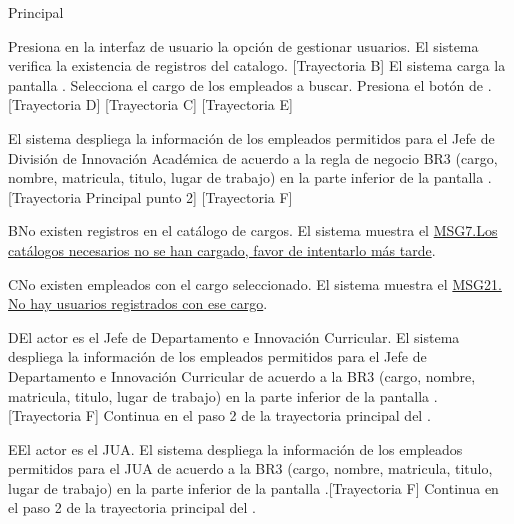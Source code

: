 \begin{UCtrayectoria}{Principal}
    
    \UCpaso[\UCactor] Presiona en la interfaz de usuario  la opción de gestionar usuarios. 
    \UCpaso  El sistema verifica la existencia de registros del catalogo. [Trayectoria B] 
    \UCpaso El sistema carga la pantalla  .
    \UCpaso[\UCactor] Selecciona el cargo de los empleados a buscar. 
    \UCpaso[\UCactor]  Presiona el botón de . [Trayectoria D] [Trayectoria C] [Trayectoria E]
    
    \UCpaso El sistema despliega la información de los empleados permitidos para el Jefe de División de Innovación Académica de acuerdo a la regla de negocio BR3 (cargo, nombre, matricula, titulo, lugar de trabajo) en la parte inferior de la pantalla . [Trayectoria Principal punto 2] [Trayectoria F]
\end{UCtrayectoria}

\begin{UCtrayectoriaA}{B}{No existen registros en el catálogo de cargos.}
    \UCpaso     El sistema muestra el \hyperref[MSG7]{MSG7.Los catálogos necesarios no se han cargado, favor de intentarlo más tarde}.
\end{UCtrayectoriaA}

\begin{UCtrayectoriaA}{C}{No existen  empleados con el cargo seleccionado.}
    \UCpaso     El sistema muestra el \hyperref[MSG21]{MSG21. No hay usuarios registrados con ese cargo}.
\end{UCtrayectoriaA}

\begin{UCtrayectoriaA}{D}{El actor es el Jefe de Departamento e Innovación Curricular.}
 \UCpaso El sistema despliega la información  de los empleados permitidos para el Jefe de Departamento e Innovación Curricular de acuerdo a la BR3 (cargo, nombre, matricula, titulo, lugar de trabajo) en la parte inferior de la pantalla . [Trayectoria F]
  \UCpaso Continua en el paso 2 de la trayectoria principal del .
\end{UCtrayectoriaA}

\begin{UCtrayectoriaA}{E}{El actor es el JUA.}
 \UCpaso El sistema despliega la información  de los empleados permitidos para el JUA de acuerdo a la BR3 (cargo, nombre, matricula, titulo, lugar de trabajo) en la parte inferior de la pantalla .[Trayectoria F]
 \UCpaso Continua en el paso 2 de la trayectoria principal del .
\end{UCtrayectoriaA}

